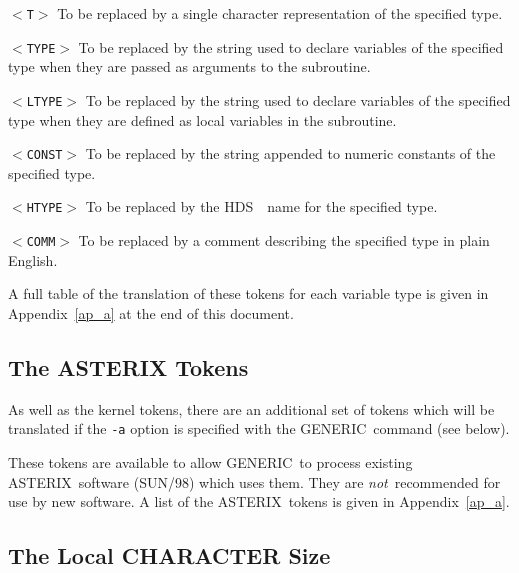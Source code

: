 \documentclass[twoside,11pt]{article}
\renewcommand{\_}{{\tt\char'137}}     %
\newcommand{\htmlref}[2]{#1}
\newcommand{\xref}[3]{#1}
\newcommand{\ASTERIX}{{\footnotesize ASTERIX}\normalsize}
\newcommand{\ASTERIXref}{\xref{\ASTERIX}{sun98}{}}
\newcommand{\GENERIC}{{\footnotesize GENERIC}\normalsize}
\newcommand{\HDS}{{\footnotesize HDS}\normalsize}
\newcommand{\HDSref}{\xref{\HDS}{sun92}{}~}
\newcommand{\latexelsehtml}[2]{#1}
\newcommand{\latexelsehtml}[2]{#2}
\begin{document}
\begin{list}{}{\setlength{\labelwidth}{\numlen}\setlength{\leftmargin}{\numlen}
\addtolength{\leftmargin}{\labelsep}}

\item[{\tt $<$T$>$}] To be replaced by a single character representation
of the specified type.

\item[{\tt $<$TYPE$>$}] To be replaced by the string used to declare variables
of the specified type when they are passed as arguments to
the subroutine.

\item[{\tt $<$LTYPE$>$}] To be replaced by the string used to declare variables
of the specified type when they are defined as local variables
in the subroutine.

\item[{\tt $<$CONST$>$}] To be replaced by the string appended to numeric
constants of the specified type.

\item[{\tt $<$HTYPE$>$}] To be replaced by the \HDSref\ name for the specified
type.

\item[{\tt $<$COMM$>$}] To be replaced by a comment describing the specified type
in plain English.

\end{list}

A full table of the translation of these tokens for each variable type
is given in
\latexelsehtml{Appendix~\ref{ap_a}}{the
\htmlref{token translations}{ap_a}}
at the end of this document.

\subsection{The ASTERIX Tokens}

As well as the kernel tokens, there are an additional set of
tokens which will be translated if the {\tt -a} option is specified
with the \GENERIC\ command (see below).

These tokens are available to allow \GENERIC\ to process existing
\ASTERIXref\ software (SUN/98) which uses them.
They are {\em not}\ recommended for use by new software.
A list of the \ASTERIX\ tokens is given in
\latexelsehtml{Appendix~\ref{ap_a}}{the
\htmlref{token translations}{ap_a}}.

\subsection{The Local CHARACTER Size}
\end{document}
